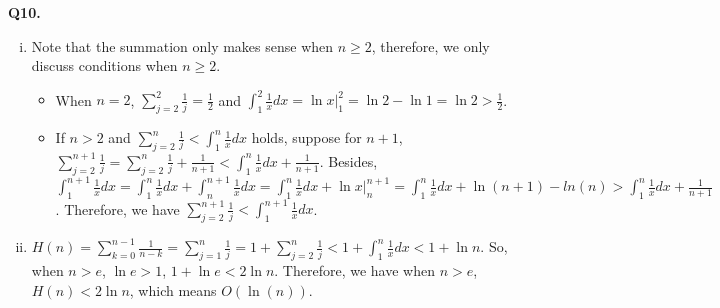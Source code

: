 \documentclass{article}[12pt]
\begin{document}
\newpage
\noindent \textbf{Q10.}
\begin{enumerate}[(i)]
\item Note that the summation only makes sense when $n\geq 2$, therefore, we only discuss conditions when $n\geq 2$.
\begin{itemize} 
\item When $n=2$, $\sum_{j=2}^{2} \frac{1}{j}=\frac{1}{2}$ and $\int_{1}^{2} \frac{1}{x} d x=\ln x|^2_1=\ln 2-\ln 1=\ln 2>\frac{1}{2}$.
\item If $n>2$ and $\sum_{j=2}^{n} \frac{1}{j}<\int_{1}^{n} \frac{1}{x} d x$ holds, suppose for $n+1$, $\sum_{j=2}^{n+1} \frac{1}{j}=\sum_{j=2}^{n} \frac{1}{j}+\frac{1}{n+1}<\int_{1}^{n} \frac{1}{x} d x+\frac{1}{n+1}$. Besides, $\int_{1}^{n+1} \frac{1}{x} d x=\int_{1}^{n} \frac{1}{x} d x+\int_{n}^{n+1} \frac{1}{x} d x=\int_{1}^{n} \frac{1}{x} d x+\ln x|^{n+1}_n=\int_{1}^{n} \frac{1}{x} d x+\ln (n+1) - ln(n)>\int_{1}^{n} \frac{1}{x} d x+\frac{1}{n+1}$. Therefore, we have $\sum_{j=2}^{n+1} \frac{1}{j}<\int_{1}^{n+1} \frac{1}{x} d x$.
\end{itemize}
\item $H(n)=\sum_{k=0}^{n-1} \frac{1}{n-k}=\sum_{j=1}^{n} \frac{1}{j}=1+\sum_{j=2}^{n} \frac{1}{j}<1+\int_{1}^{n} \frac{1}{x} d x<1+\ln n$. So, when $n>e$, $\ln e>1$, $1+\ln e<2\ln n$. Therefore, we have when $n>e$, $H(n)<2\ln n$, which means $O(\ln (n))$.
\end{enumerate}
\end{document}
